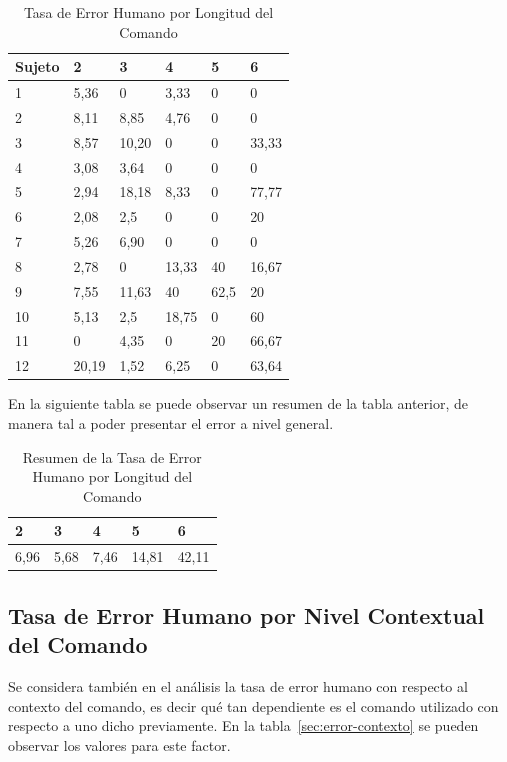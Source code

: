 \begin{table}[H]
\centering
\footnotesize
\begin{tabular}{|p{1.6cm}|p{1.6cm}|p{1.6cm}|p{1.6cm}|p{1.6cm}|p{1.6cm}|}
\hline
    Sujeto & 2 & 3 & 4 & 5 & 6  \\
    \hline 
    1 & 5,36   & 0     & 3,33  &0   &0 \\
    2 & 8,11   & 8,85  & 4,76  &0   &0 \\
    3 & 8,57   & 10,20 & 0 &  0  &33,33 \\
    4 & 3,08   & 3,64 & 0  & 0  & 0 \\
    5 & 2,94   & 18,18 & 8,33 &  0 & 77,77 \\
    6 & 2,08   & 2,5 & 0 & 0 & 20 \\
    7 & 5,26   & 6,90 & 0 & 0 & 0 \\
    8 & 2,78   & 0 & 13,33 & 40 & 16,67 \\
    9 & 7,55   & 11,63 & 40  &  62,5  & 20 \\
    10 & 5,13  & 2,5  & 18,75  &  0 & 60 \\
    11 & 0     & 4,35 & 0 & 20 & 66,67 \\
    12 & 20,19 & 1,52 & 6,25 & 0  & 63,64 \\
\hline
\end{tabular}
\caption{Tasa de Error Humano por Longitud del Comando}
\label{sec:error-longitud}
\end{table}

En la siguiente tabla se puede observar un resumen de la tabla anterior, de manera tal a poder presentar
el error a nivel general.

\begin{table}[H]
\centering
\footnotesize
\begin{tabular}{|p{1.6cm}|p{1.6cm}|p{1.6cm}|p{1.6cm}|p{1.6cm}|}
\hline
    2 & 3 & 4 & 5 & 6  \\
    \hline 
    6,96 & 5,68 & 7,46 & 14,81 & 42,11 \\
    \hline
\end{tabular}
\caption{Resumen de la Tasa de Error Humano por Longitud del Comando}
\label{sec:error-longitud-resumen}
\end{table}


\subsection{Tasa de Error Humano por Nivel Contextual del Comando}

Se considera tambi\'en en el an\'alisis la tasa de error humano con respecto al contexto del comando, es decir
qu\'e tan dependiente es el comando utilizado con respecto a uno dicho previamente. 
En la tabla~\ref{sec:error-contexto} se pueden observar los valores para este factor.

